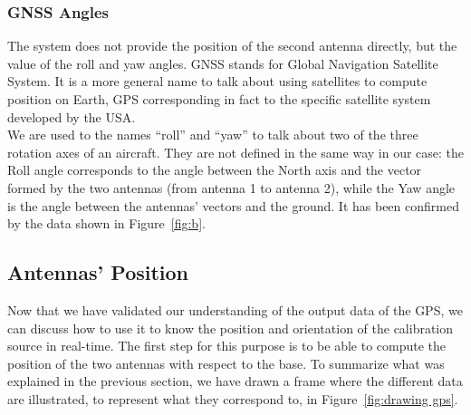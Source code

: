 \documentclass[../../thesis.tex]{subfiles}
\begin{document}
\subsubsection{GNSS Angles}
The system does not provide the position of the second antenna directly, but the value of the roll and yaw angles. GNSS stands for Global Navigation Satellite System. It is a more general name to talk about using satellites to compute position on Earth, GPS corresponding in fact to the specific satellite system developed by the USA. \\
We are used to the names ``roll'' and ``yaw'' to talk about two of the three rotation axes of an aircraft. They are not defined in the same way in our case: the Roll angle corresponds to the angle between the North axis and the vector formed by the two antennas (from antenna 1 to antenna 2), while the Yaw angle is the angle between the antennas' vectors and the ground. It has been confirmed by the data shown in Figure~\ref{fig:b}.


\subsection{Antennas' Position} \label{section: antennas' position}
Now that we have validated our understanding of the output data of the GPS, we can discuss how to use it to know the position and orientation of the calibration source in real-time. The first step for this purpose is to be able to compute the position of the two antennas with respect to the base. To summarize what was explained in the previous section, we have drawn a frame where the different data are illustrated, to represent what they correspond to, in Figure~\ref{fig:drawing gps}.
\end{document}
